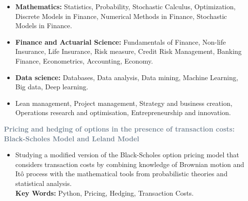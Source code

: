 \documentclass[10pt,a4paper,ragged2e]{altacv}
\begin{document}
\begin{itemize}
    


   \item { \textbf{Mathematics:} Statistics, Probability, Stochastic Calculus, Optimization, Discrete Models in Finance, Numerical Methods in Finance, Stochastic Models in Finance.}
    
    
    \item {\textbf{Finance and Actuarial Science:} Fundamentals of Finance, Non-life Insurance, Life Insurance, Risk measure, Credit Risk Management, Banking Finance, Econometrics, Accounting, Economy.}
    
    
    \item {\textbf{Data science:} Databases, Data analysis, Data mining, Machine Learning, Big data, Deep learning.}
    
    
    \item {Lean management, Project management, Strategy and business creation, Operations research and optimisation, Entrepreneurship and innovation.}
\end{itemize}





 

 

\textcolor{SlateGrey}{\textbf{Pricing and hedging of options in the presence of transaction costs: Black-Scholes Model and Leland Model}}
\newline

\begin{itemize}
    \item Studying a modified version of the Black-Scholes option pricing model that considers transaction costs by combining knowledge of Brownian motion and Itô process with the mathematical tools from probabilistic theories and statistical analysis.\\
   { \textbf{Key Words:} Python, Pricing, Hedging, Transaction Costs.}
\end{itemize}
\end{document}
